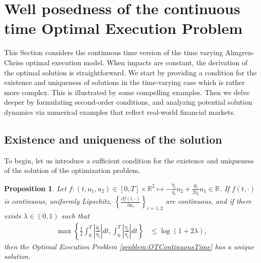 \documentclass[final,3p,authoryear,12pt]{elsarticle}
\newtheorem{proposition}{Proposition}
\begin{document}
%


\section{Well posedness of the continuous time Optimal Execution Problem}
\label{secton3:CT}

This Section considers the continuous time version of the time varying Almgren-Chriss optimal execution model. When impacts are constant, the derivation of the optimal solution is straightforward. We start by providing a condition for the existence and uniqueness of solutions in the time-varying case which is rather more complex. This is illustrated by some compelling examples. Then we delve deeper by formulating second-order conditions, and analyzing potential solution dynamics via numerical examples that reflect real-world financial markets. %

\subsection{Existence and uniqueness of the solution}
To begin, let us introduce a sufficient condition for the existence and uniqueness of the solution of the optimization problem.
\begin{proposition}
\label{proposition:ExistenceandUniquenessCT}
Let $f: (t,u_1,u_2)\in [0,T]\times\mathbb{R}^{2}\mapsto -\frac{\dot \eta_{t}}{\eta_{t}}u_{2} + \frac{\dot \theta_{t}}{2\eta_{t}}u_{1}\in \mathbb{R}$. 
If $f(t,\cdot)$ is continuous, uniformly Lipschitz, $\left \{\frac{\partial f(t,\cdot)}{\partial u_{i}}\right \}_{i=1,2}$ are continuous, and if there exists $\lambda \in (0,1)$ such that
       \begin{align}
       \label{existence_and_uniqueness_inequalities}
        \max\left\{\frac{1}{2}\int_{0}^{T}\left| \frac{\dot \theta_{t}}{\eta_{t}}\right| dt , \int_{0}^{T}\left| \frac{\dot \eta_{t}}{\eta_{t}}\right|dt \right\}&\le \log(1+2\lambda),
        \end{align}
then the Optimal Execution Problem \eqref{problem:OTContinuousTime} has a unique solution.
\end{proposition}
\end{document}
